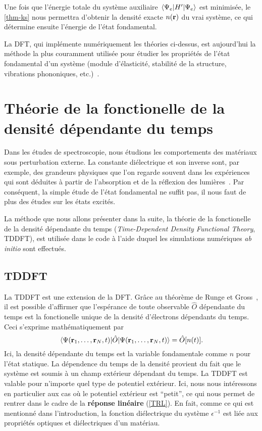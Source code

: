 Une fois que l'énergie totale du système auxiliaire $\ev{H'}{\Psi_e}$ est minimisée,
le \cref{thm-ks} nous permettra d'obtenir la densité exacte $n(\vb{r})$ du vrai système,
ce qui détermine ensuite l'énergie de l'état fondamental.

La DFT, qui implémente numériquement les théories ci-dessus,
est aujourd'hui la méthode la plus couramment utilisée pour étudier
les propriétés de l'état fondamental d'un système
(module d'élasticité, stabilité de la structure, vibrations phononiques, etc.)~\cite{Martin2004}.

\section{Théorie de la fonctionelle de la densité dépendante du temps}
\label{sec-TDDFT}
Dans les études de spectroscopie,
nous étudions les comportements des matériaux sous perturbation externe.
La constante diélectrique et son inverse sont, par exemple,
des grandeurs physiques que l'on regarde souvent dans les expériences
qui sont déduites à partir de l'absorption et de la réflexion des lumières~\cite{Sottile2003}.
Par conséquent, la simple étude de l'état fondamental ne suffit pas,
il nous faut de plus des études sur les états excités.

La méthode que nous allons présenter dans la suite,
la théorie de la fonctionelle de la densité dépendante du temps
(\textit{Time-Dependent Density Functional Theory}, TDDFT),
est utilisée dans le code à l'aide duquel les simulations numériques \textit{ab initio} sont effectués.

\subsection{TDDFT}
La TDDFT est une extension de la DFT\@.
Grâce au théorème de Runge et Gross~\cite{Runge1984},
il est possible d'affirmer que l'espérance de toute observable $\hat{O}$ dépendante du temps
est la fonctionelle unique de la densité d'électrons dépendants du temps.
Ceci s'exprime mathématiquement par
\begin{equation}
  \ev{\hat{O}}{\Psi(\vb{r}_1, \ldots, \vb{r}_N, t)} = \hat{O}[n(t)].
\end{equation}
Ici, la densité dépendante du temps est la variable fondamentale comme $n$ pour l'état statique.
La dépendence du temps de la densité provient du fait que le système est soumis à un champ extérieur dépendant du temps.
La TDDFT est valable pour n'importe quel type de potentiel extérieur.
Ici, nous nous intéressons en particulier aux cas où le potentiel extérieur est ``petit'',
ce qui nous permet de rentrer dans le cadre de la \textbf{réponse linéaire} (\cref{TRL}).
En fait, comme ce qui est mentionné dans l'introduction,
la fonction diélectrique du système $\epsilon^{-1}$ est liée aux propriétés optiques et diélectriques d'un matériau.

